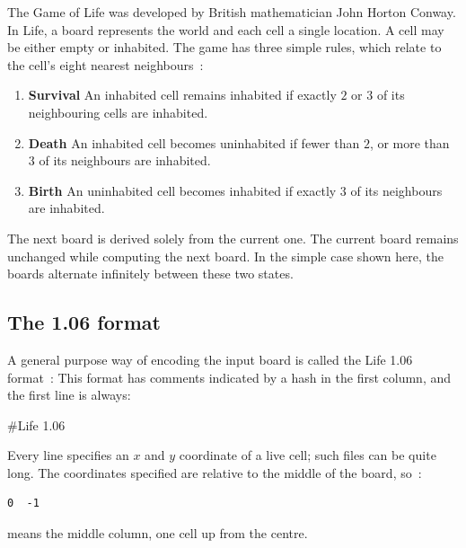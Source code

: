 


The Game of Life was developed by British mathematician
John Horton Conway. In Life, a board represents the world
and each cell a single location. A cell may be either empty
or inhabited. The game has three simple rules, which relate to the
cell's eight nearest neighbours~:
\begin{enumerate}
\item {\bf Survival} An inhabited cell remains inhabited if
exactly $2$ or $3$ of its neighbouring cells are inhabited.
\item {\bf Death} An inhabited cell becomes uninhabited if 
fewer than $2$, or more than $3$ of its neighbours are inhabited.
\item {\bf Birth} An uninhabited cell becomes inhabited if exactly
$3$ of its neighbours are inhabited.
\end{enumerate}

The next board is derived solely from the current one. The current board
remains unchanged while computing the next board.  In the simple case
shown here, the boards alternate infinitely between these two states.

\begin{center}
\end{center}

\subsection*{The 1.06 format}

A general purpose way of encoding the input board is
called the Life 1.06 format~:
This format has comments indicated by a hash in the first column,
and the first line is always:
\begin{terminaloutput}
#Life 1.06
\end{terminaloutput}
Every line specifies an $x$ and $y$ coordinate of a live cell;
such files can be quite long.
The coordinates specified are relative to the middle of the board,
so~:
\begin{verbatim}
0  -1
\end{verbatim}
means the middle column, one cell up from the centre.

